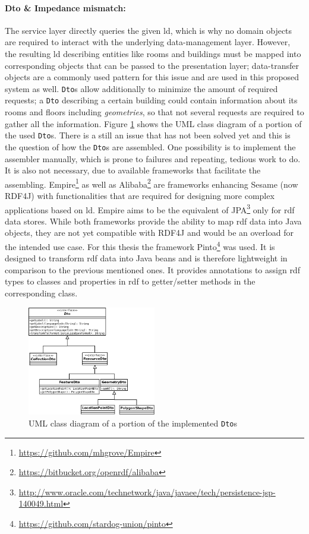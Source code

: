 \documentclass[draft,final]{vutinfth} %
\begin{document}
\paragraph{Dto \& Impedance mismatch:} The service layer directly queries the given \gls{ld}, which is why no domain objects are required to interact with the underlying data-management layer. However, the resulting \gls{ld} describing entities like rooms and buildings must be mapped into corresponding objects that can be passed to the presentation layer; data-transfer objects are a commonly used pattern for this issue and are used in this proposed system as well. \texttt{Dto}s allow additionally to minimize the amount of required requests; a \texttt{Dto} describing a certain building could contain information about its rooms and floors including \textit{geometries}, so that not several requests are required to gather all the information. Figure \ref{fig:solution-architectural-prototype:dto-uml} shows the UML class diagram of a portion of the used \texttt{Dto}s. There is a still an issue that has not been solved yet and this is the question of how the \texttt{Dto}s are assembled. One possibility is to implement the assembler manually, which is prone to failures and repeating, tedious work to do. It is also not necessary, due to available frameworks that facilitate the assembling. Empire\footnote{\url{https://github.com/mhgrove/Empire}} as well as Alibaba\footnote{\url{https://bitbucket.org/openrdf/alibaba}} are frameworks enhancing Sesame (now RDF4J) with functionalities that are required for designing more complex applications based on \gls{ld}. Empire aims to be the equivalent of JPA\footnote{\url{http://www.oracle.com/technetwork/java/javaee/tech/persistence-jsp-140049.html}} only for \gls{rdf} data stores. While both frameworks provide the ability to map \gls{rdf} data into Java objects, they are not yet compatible with RDF4J and would be an overload for the intended use case. For this thesis the framework Pinto\footnote{\url{https://github.com/stardog-union/pinto}} was used. It is designed to transform \gls{rdf} data into Java beans and is therefore lightweight in comparison to the previous mentioned ones. It provides annotations to assign \gls{rdf} types to classes and properties in \gls{rdf} to getter/setter methods in the corresponding class.

\begin{figure}[h]
    \centering
    \includegraphics[width=0.5\textwidth]{graphics/solution/architecture/dto.png}
    \caption{UML class diagram of a portion of the implemented \texttt{Dto}s}
    \label{fig:solution-architectural-prototype:dto-uml}
\end{figure}
\end{document}
